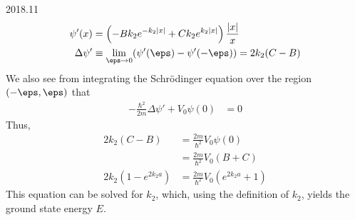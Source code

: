 \documentclass[12pt]{article}
\begin{document}
\begin{solution}{2018.11}
\begin{align*}
\psi'(x) & = \left(-B k_2 e^{-k_2 \left| x \right|} 
+ C k_2 e^{k_2 \left| x \right|} \right) \frac{\left| x \right|}{x} \\
\Delta \psi' & \equiv \lim_{\eps \rightarrow 0} (\psi'(\eps) - \psi'(-\eps)) 
= 2 k_2 (C - B)
\end{align*}
We also see from integrating the Schr\"{o}dinger equation over the region $(-\eps, \eps)$ that
\begin{align*}
-\frac{\hbar^2}{2m} \Delta \psi' + V_0 \psi(0) & = 0
\end{align*}
Thus,
\begin{align*}
2k_2 (C - B) & = \frac{2m}{\hbar^2} V_0 \psi(0) \\
& = \frac{2m}{\hbar^2} V_0 (B+C) \\
2k_2 (1 - e^{2k_2 a}) & = \frac{2m}{\hbar^2} V_0 (e^{2k_2 a} + 1)
\end{align*}
This equation can be solved for $k_2$, which, using the definition of $k_2$, yields the ground state energy $E$.
\end{solution}
\end{document}
